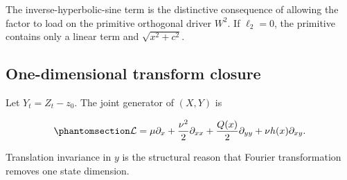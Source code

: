 \documentclass[
  english,
  11pt,
  letterpaper,
  DIV=11,
  numbers=noendperiod]{scrartcl}
\theoremstyle{plain}
\theoremstyle{plain}
\theoremstyle{plain}
\theoremstyle{plain}
\theoremstyle{remark}
\begin{document}
The inverse-hyperbolic-sine term is the distinctive consequence of
allowing the factor to load on the primitive orthogonal driver \(W^2\).
If \(\ell_2=0\), the primitive contains only a linear term and
\(\sqrt{x^2+c^2}\).

\subsection{One-dimensional transform
closure}\label{one-dimensional-transform-closure}

Let \(Y_t=Z_t-z_0\). The joint generator of \((X,Y)\) is

\begin{equation}\protect\phantomsection\label{eq-joint-generator}{
\mathcal L
=\mu\partial_x
+\frac{\nu^2}{2}\partial_{xx}
+\frac{Q(x)}{2}\partial_{yy}
+\nu h(x)\partial_{xy}.
}\end{equation}

Translation invariance in \(y\) is the structural reason that Fourier
transformation removes one state dimension.
\end{document}
